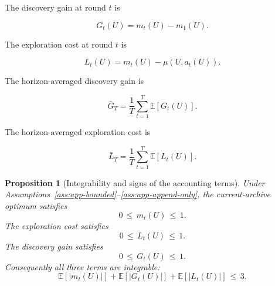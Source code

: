 \documentclass{article} %
\newtheorem{proposition}[theorem]{Proposition}
\begin{document}
The discovery gain at round \(t\) is

\begin{equation}
\label{eq:app-gt}
G_t(U)
=
m_t(U)-m_1(U).
\end{equation}

The exploration cost at round \(t\) is

\begin{equation}
\label{eq:app-lt}
L_t(U)
=
m_t(U)-\mu(U,a_t(U)).
\end{equation}

The horizon-averaged discovery gain is

\begin{equation}
\label{eq:app-barg}
\bar G_T
=
\frac{1}{T}\sum_{t=1}^{T}\mathbb{E}[G_t(U)].
\end{equation}

The horizon-averaged exploration cost is

\begin{equation}
\label{eq:app-barl}
\bar L_T
=
\frac{1}{T}\sum_{t=1}^{T}\mathbb{E}[L_t(U)].
\end{equation}

\begin{proposition}[Integrability and signs of the accounting terms]
\label{prop:1}
Under Assumptions~\ref{ass:app-bounded}--\ref{ass:app-append-only}, the current-archive optimum satisfies
\begin{equation}
\label{eq:app-prop-m-bound}
0 \,\le\, m_t(U) \,\le\, 1.
\end{equation}
The exploration cost satisfies
\begin{equation}
\label{eq:app-prop-l-bound}
0 \,\le\, L_t(U) \,\le\, 1.
\end{equation}
The discovery gain satisfies
\begin{equation}
\label{eq:app-prop-g-bound}
0 \,\le\, G_t(U) \,\le\, 1.
\end{equation}
Consequently all three terms are integrable:
\begin{equation}
\label{eq:app-prop-integrable}
\mathbb{E}[|m_t(U)|]+\mathbb{E}[|G_t(U)|]+\mathbb{E}[|L_t(U)|] \,\le\, 3.
\end{equation}
\end{proposition}
\end{document}
